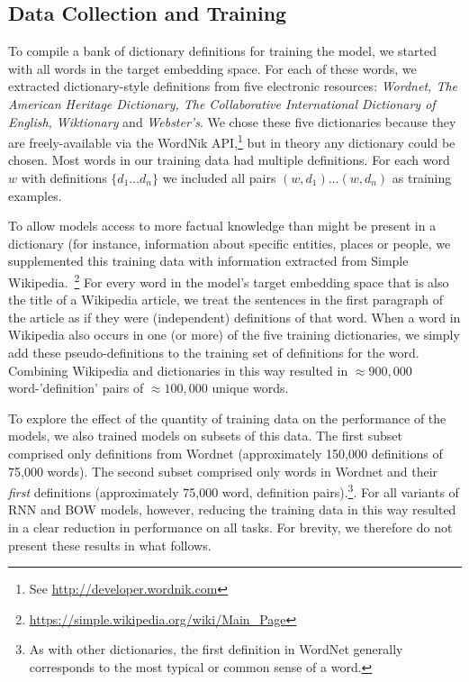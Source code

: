 \subsection{Data Collection and Training}

To compile a bank of dictionary definitions for training the model, we started with all words in the target embedding space. For each of these words, we extracted dictionary-style definitions from five electronic resources: \emph{Wordnet, The American Heritage Dictionary, The Collaborative International Dictionary of English, Wiktionary} and \emph{Webster's}. We chose these five dictionaries because they are freely-available via the WordNik API,\footnote{See \url{http://developer.wordnik.com}} but in theory any dictionary could be chosen. Most words in our training data had multiple definitions. For each word \(w\) with definitions \( \{d_1 \dots d_n\} \) we included all pairs \((w, d_1) \dots (w,d_n) \) as training examples. 

To allow models access to more factual knowledge than might be present in a dictionary (for instance, information about specific entities, places or people, we supplemented this training data with information extracted from Simple Wikipedia.~\footnote{\url{https://simple.wikipedia.org/wiki/Main_Page}} For every word in the model's target embedding space that is also the title of a Wikipedia article, we treat the sentences in the first paragraph of the article as if they were (independent) definitions of that word. When a word in Wikipedia also occurs in one (or more) of the five training dictionaries, we simply add these pseudo-definitions to the training set of definitions for the word. Combining Wikipedia and dictionaries in this way resulted in \(\approx 900,000\) word-'definition' pairs of \(\approx 100,000\) unique words. 

To explore the effect of the quantity of training data on the performance of the models, we also trained models on subsets of this data. The first subset comprised only definitions from Wordnet (approximately 150,000 definitions of 75,000 words). The second subset comprised only words in Wordnet and their \emph{first} definitions (approximately 75,000 word, definition pairs).\footnote{As with other dictionaries, the first definition in WordNet generally corresponds to the most typical or common sense of a word.}. For all variants of RNN and BOW models, however, reducing the training data in this way resulted in a clear reduction in performance on all tasks. For brevity, we therefore do not present these results in what follows.  

